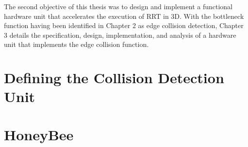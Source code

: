 
The second objective of this thesis was to design and implement a functional hardware unit that accelerates the execution of \gls{RRT} in \gls{3D}. With the bottleneck function having been identified in Chapter 2 as edge collision detection, Chapter 3 details the specification, design, implementation, and analysis of a hardware unit that implements the edge collision function.

\section{Defining the Collision Detection Unit}
    

\newpage

\section{HoneyBee}
    
